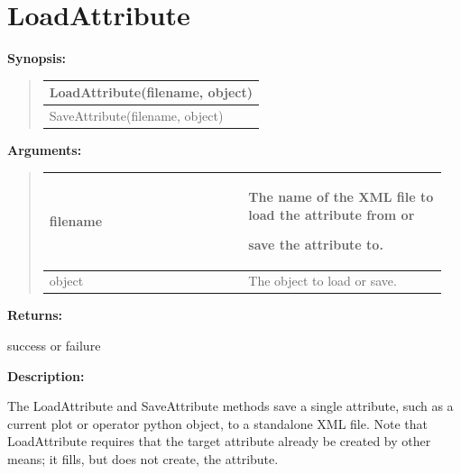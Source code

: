 \documentclass[letterpaper,10pt,english]{sphinxmanual}
\begin{document}
\section{LoadAttribute}
\label{functions:loadattribute}
\begin{DUlineblock}{0em}
\item[] \textbf{Synopsis:}
\end{DUlineblock}
\begin{quote}

\begin{tabulary}{\linewidth}{|L|}
\hline

LoadAttribute(filename, object)
\\
\hline
SaveAttribute(filename, object)
\\
\hline\end{tabulary}

\end{quote}

\begin{DUlineblock}{0em}
\item[] 
\item[] \textbf{Arguments:}
\end{DUlineblock}
\begin{quote}

\begin{tabular}{|p{0.475\linewidth}|p{0.475\linewidth}|}
\hline

filename
 & 
\begin{DUlineblock}{0em}
\item[] The name of the XML file to load the attribute from or
\item[] save the attribute to.
\end{DUlineblock}
\\
\hline
object
 & 
The object to load or save.
\\
\hline\end{tabular}

\end{quote}

\begin{DUlineblock}{0em}
\item[] 
\item[] \textbf{Returns:}
\item[] success or failure
\item[] 
\item[] \textbf{Description:}
\item[] The LoadAttribute and SaveAttribute methods save a single
attribute, such as a current plot or operator python object,
to a standalone XML file.  Note that LoadAttribute requires
that the target attribute already be created by other means;
it fills, but does not create, the attribute.
\end{DUlineblock}
\end{document}
